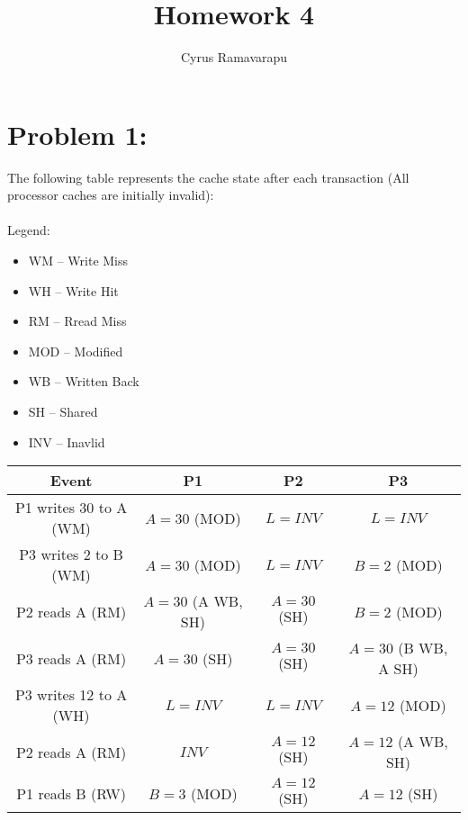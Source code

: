 \documentclass{article}
\begin{document}
\title{Homework 4}
\author{Cyrus Ramavarapu}
\renewcommand{\today}{31 October 2016}
\maketitle

\section*{Problem 1:}
The following table represents the cache state after
each transaction (All processor caches are initially
invalid):\\\\
Legend:
\begin{itemize}
\item WM -- Write Miss
\item WH -- Write Hit 
\item RM -- Rread Miss
\item MOD -- Modified
\item WB -- Written Back
\item SH -- Shared
\item INV -- Inavlid
\end{itemize} 
\begin{flushleft}
\begin{tabular}{c|ccc}
Event & P1 & P2 & P3 \\ \hline
P1 writes 30 to A (WM) & $ A = 30$ (MOD) & $L = INV$ & $L = INV$ \\ \hline
P3 writes 2 to B (WM) & $ A = 30$ (MOD) & $L = INV$ & $ B = 2$ (MOD)\\ \hline
P2 reads A (RM) & $ A = 30$ (A WB, SH) & $ A = 30$ (SH) & $ B = 2$ (MOD)\\ \hline
P3 reads A (RM) & $A = 30$ (SH) & $ A = 30$ (SH) & $ A = 30$ (B WB, A SH)\\ \hline
P3 writes 12 to A (WH) & $L = INV$ & $L=INV$ & $ A = 12$ (MOD)\\ \hline
P2 reads A (RM) & $INV$ & $ A = 12$ (SH) & $A = 12$ (A WB, SH)\\ \hline
P1 reads B (RW) & $B=3$ (MOD) & $A = 12$ (SH) &  $A = 12$ (SH) \\ \hline
 
\end{tabular}
\end{flushleft}
\end{document}
